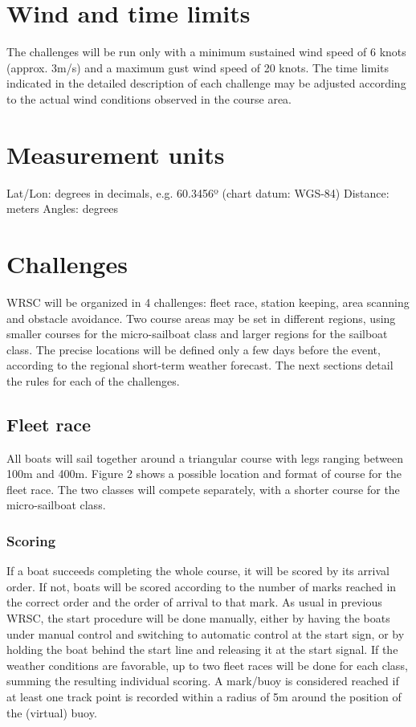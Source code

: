 \documentclass[12pt]{article}
\begin{document}
\section{Wind and time limits}
The challenges will be run only with a minimum sustained wind speed of 6 knots
(approx. 3m/s)
and a maximum gust wind speed of 20 knots. The time limits indicated in the
detailed
description of each challenge may be adjusted according to the actual wind
conditions observed
in the course area.

\section{Measurement units}
Lat/Lon: degrees in decimals, e.g. 60.3456º (chart datum: WGS-84)
Distance: meters
Angles: degrees

\section{Challenges}
WRSC will be organized in 4 challenges: fleet race, station keeping, area
scanning and obstacle avoidance.
Two course areas may be set in different regions, using smaller courses for the
micro-sailboat
class and larger regions for the sailboat class. The precise locations will be
defined only a few
days before the event, according to the regional short-term weather forecast.
The next sections
detail the rules for each of the challenges.

\subsection{Fleet race}

All boats will sail together around a triangular course with legs ranging
between 100m and
400m. Figure 2 shows a possible location and format of course for the fleet
race. The two
classes will compete separately, with a shorter course for the micro-sailboat
class.
\subsubsection{Scoring}

If a boat succeeds completing the whole course, it will be scored by its arrival
order. If not,
boats will be scored according to the number of marks reached in the correct
order and the
order of arrival to that mark. As usual in previous WRSC, the start procedure
will be done
manually, either by having the boats under manual control and switching to
automatic control
at the start sign, or by holding the boat behind the start line and releasing it
at the start signal.
If the weather conditions are favorable, up to two fleet races will be done for
each class,
summing the resulting individual scoring. A mark/buoy is considered reached if
at least one
track point is recorded within a radius of 5m around the position of the
(virtual) buoy.
\end{document}
